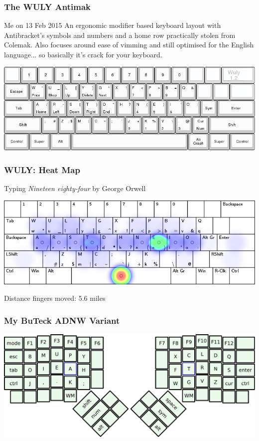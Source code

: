 \documentclass{beamer}
\begin{document}
\begin{frame}
    \frametitle{The WULY Antimak}
    \begin{block}{Me on 13 Feb 2015}
        An ergonomic modifier based keyboard layout with Antibracket's symbols and numbers and a home row practically stolen from Colemak. Also focuses around ease of vimming and still optimised for the English language... so basically it's crack for your keyboard.
    \end{block}
    \begin{center}
        \includegraphics[width=\linewidth]{graphics/wuly}
    \end{center}
\end{frame}

\begin{frame}
    \frametitle{WULY: Heat Map}
    Typing \emph{Nineteen eighty-four} by George Orwell
    \begin{center}
        \includegraphics[width=\linewidth]{graphics/wulyheat}\par
    Distance fingers moved: 5.6 miles
    \end{center}
\end{frame}

\begin{frame}
    \frametitle{My BuTeck ADNW Variant}
    \begin{center}
        \includegraphics[width=\linewidth]{graphics/doxicalmain}
    \end{center}
\end{frame}
\end{document}

